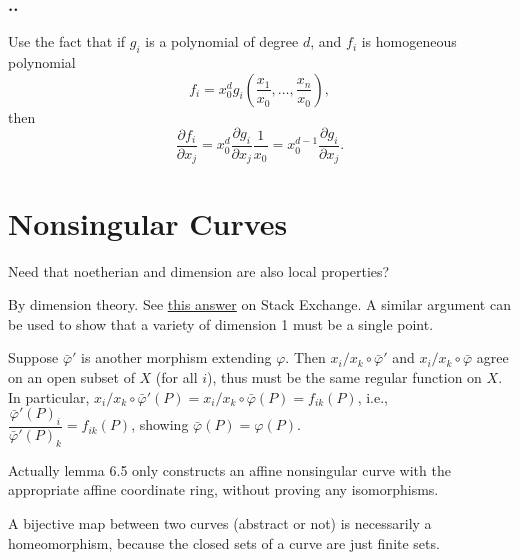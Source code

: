\documentclass{note}
\newcounter{exercise}[section]
\newcommand{\Ex}{%
    \stepcounter{exercise}%
    \subsubsection*{\thesection.\arabic{exercise}.}%
}
\begin{document}
\setcounter{exercise}{7}

\Ex

Use the fact that if $g_i$ is a polynomial of degree $d$, and $f_i$ is homogeneous
polynomial
\begin{equation*}
  f_i = x_0^d g_i\left(\frac{x_1}{x_0}, \dots, \frac{x_n}{x_0}\right),
\end{equation*}
then
\begin{equation*}
  \frac{\partial f_i}{\partial x_j} = x_0^d\frac{\partial g_i}{\partial
    x_j}\frac{1}{x_0} = x_0^{d-1}\frac{\partial g_i}{\partial x_j}.
\end{equation*}

\section{Nonsingular Curves}

 Need that noetherian and dimension are also local
properties?


By dimension theory. See
\href{https://math.stackexchange.com/questions/140592/closed-proper-subvarieties-of-curves-are-finite-sets-of-points}
{this answer} on Stack Exchange. A similar argument can be used to show that a
variety of dimension 1 must be a single point.



Suppose $\bar\varphi'$ is another morphism extending $\varphi$. Then
$x_i/x_k\circ\bar\varphi'$ and $x_i/x_k\circ\bar\varphi$ agree on an open subset of
$X$ (for all $i$), thus must be the same regular function on $X$. In particular,
$x_i/x_k\circ\bar\varphi'(P) = x_i/x_k\circ\bar\varphi(P) = f_{ik}(P)$, i.e.,
$\dfrac{\bar\varphi'(P)_i}{\bar\varphi'(P)_k} = f_{ik}(P)$, showing $\bar\varphi(P)
= \varphi(P)$.

 Actually lemma 6.5 only constructs an affine nonsingular curve
with the appropriate affine coordinate ring, without proving any isomorphisms.



A bijective map between two curves (abstract or not) is necessarily a homeomorphism,
because the closed sets of a curve are just finite sets.
\end{document}
